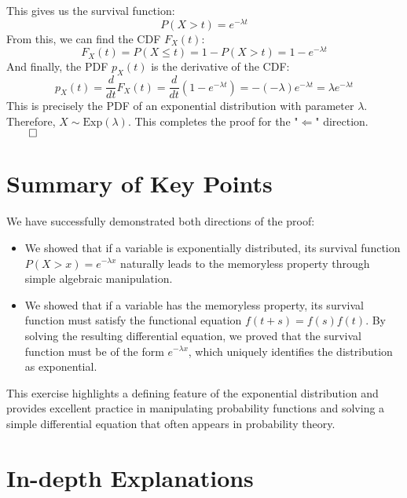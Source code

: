 \documentclass[11pt,a4paper]{article}
\begin{document}
This gives us the survival function:
\[ P(X > t) = e^{-\lambda t} \]
From this, we can find the CDF $F_X(t)$:
\[ F_X(t) = P(X \le t) = 1 - P(X > t) = 1 - e^{-\lambda t} \]
And finally, the PDF $p_X(t)$ is the derivative of the CDF:
\[ p_X(t) = \frac{d}{dt} F_X(t) = \frac{d}{dt} (1 - e^{-\lambda t}) = -(-\lambda)e^{-\lambda t} = \lambda e^{-\lambda t} \]
This is precisely the PDF of an exponential distribution with parameter $\lambda$. Therefore, $X \sim \text{Exp}(\lambda)$. This completes the proof for the "$\Leftarrow$" direction. $\qed$

\section{Summary of Key Points}
We have successfully demonstrated both directions of the proof:
\begin{itemize}
    \item We showed that if a variable is exponentially distributed, its survival function $P(X>x)=e^{-\lambda x}$ naturally leads to the memoryless property through simple algebraic manipulation.
    \item We showed that if a variable has the memoryless property, its survival function must satisfy the functional equation $f(t+s)=f(s)f(t)$. By solving the resulting differential equation, we proved that the survival function must be of the form $e^{-\lambda x}$, which uniquely identifies the distribution as exponential.
\end{itemize}
This exercise highlights a defining feature of the exponential distribution and provides excellent practice in manipulating probability functions and solving a simple differential equation that often appears in probability theory.

\newpage
\section{In-depth Explanations}
\end{document}
